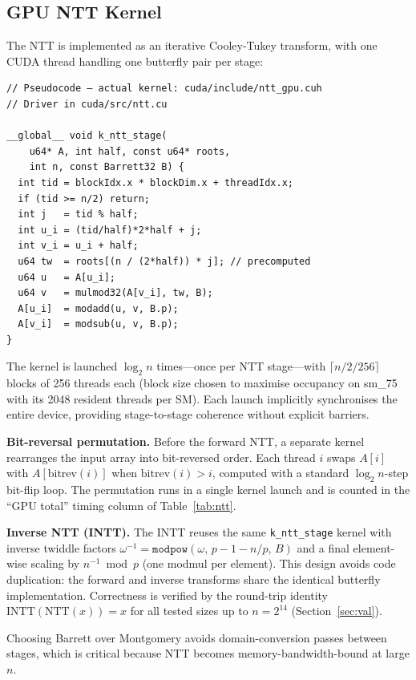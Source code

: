 \documentclass[conference]{IEEEtran}
\begin{document}
\subsection{GPU NTT Kernel}

The NTT is implemented as an iterative Cooley-Tukey transform, with one CUDA
thread handling one butterfly pair per stage:

\begin{lstlisting}
// Pseudocode — actual kernel: cuda/include/ntt_gpu.cuh
// Driver in cuda/src/ntt.cu

__global__ void k_ntt_stage(
    u64* A, int half, const u64* roots,
    int n, const Barrett32 B) {
  int tid = blockIdx.x * blockDim.x + threadIdx.x;
  if (tid >= n/2) return;
  int j   = tid % half;
  int u_i = (tid/half)*2*half + j;
  int v_i = u_i + half;
  u64 tw  = roots[(n / (2*half)) * j]; // precomputed
  u64 u   = A[u_i];
  u64 v   = mulmod32(A[v_i], tw, B);
  A[u_i]  = modadd(u, v, B.p);
  A[v_i]  = modsub(u, v, B.p);
}
\end{lstlisting}

The kernel is launched $\log_2 n$ times---once per NTT stage---with
$\lceil n/2 / 256 \rceil$ blocks of 256 threads each (block size chosen to
maximise occupancy on sm\_75 with its 2048 resident threads per SM). Each
launch implicitly synchronises the entire device, providing stage-to-stage
coherence without explicit barriers.

\textbf{Bit-reversal permutation.} Before the forward NTT, a separate kernel
rearranges the input array into bit-reversed order. Each thread $i$ swaps
$A[i]$ with $A[\text{bitrev}(i)]$ when $\text{bitrev}(i) > i$, computed with a
standard $\log_2 n$-step bit-flip loop. The permutation runs in a single kernel
launch and is counted in the ``GPU total'' timing column of Table~\ref{tab:ntt}.

\textbf{Inverse NTT (INTT).} The INTT reuses the same
\texttt{k\_ntt\_stage} kernel with inverse twiddle factors
$\omega^{-1} = \texttt{modpow}(\omega,\, p-1-n/p,\, B)$ and a final
element-wise scaling by $n^{-1} \bmod p$ (one modmul per element). This
design avoids code duplication: the forward and inverse transforms share the
identical butterfly implementation. Correctness is verified by the round-trip
identity $\text{INTT}(\text{NTT}(x)) = x$ for all tested sizes up to
$n = 2^{14}$ (Section~\ref{sec:val}).

Choosing Barrett over Montgomery avoids domain-conversion passes
between stages, which is critical because NTT becomes memory-bandwidth-bound at
large $n$.
\end{document}
